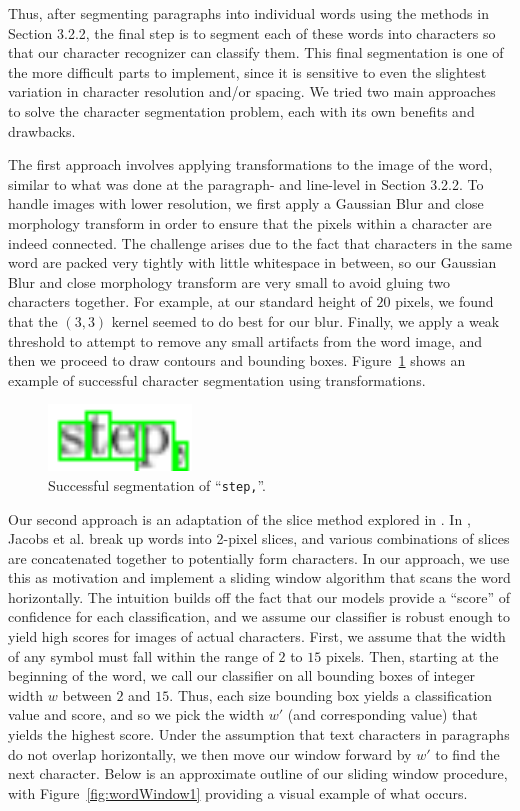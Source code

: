 \documentclass[12pt]{IEEEtran}
\begin{document}
Thus, after segmenting paragraphs into individual words using the methods in Section 3.2.2, the final step is to segment each of these words into characters so that our character recognizer can classify them. This final segmentation is one of the more difficult parts to implement, since it is sensitive to even the slightest variation in character resolution and/or spacing. We tried two main approaches to solve the character segmentation problem, each with its own benefits and drawbacks.

The first approach involves applying transformations to the image of the word, similar to what was done at the paragraph- and line-level in Section 3.2.2. To handle images with lower resolution, we first apply a Gaussian Blur and close morphology transform in order to ensure that the pixels within a character are indeed connected. The challenge arises due to the fact that characters in the same word are packed very tightly with little whitespace in between, so our Gaussian Blur and close morphology transform are very small to avoid gluing two characters together. For example, at our standard height of $20$ pixels, we found that the $(3,3)$ kernel seemed to do best for our blur. Finally, we apply a weak threshold to attempt to remove any small artifacts from the word image, and then we proceed to draw contours and bounding boxes. Figure~\ref{fig:wordBounds1} shows an example of successful character segmentation using transformations.

\begin{figure}[h]
  \centering
    \includegraphics[width=1.5in]{word3-bounds.png}
  \caption{Successful segmentation of ``\texttt{step,}''.}
  \label{fig:wordBounds1}
\end{figure}

Our second approach is an adaptation of the slice method explored in \cite{1}. In \cite{1}, Jacobs et al. break up words into 2-pixel slices, and various combinations of slices are concatenated together to potentially form characters. In our approach, we use this as motivation and implement a sliding window algorithm that scans the word horizontally. The intuition builds off the fact that our models provide a ``score'' of confidence for each classification, and we assume our classifier is robust enough to yield high scores for images of actual characters. First, we assume that the width of any symbol must fall within the range of $2$ to $15$ pixels. Then, starting at the beginning of the word, we call our classifier on all bounding boxes of integer width $w$ between $2$ and $15$. Thus, each size bounding box yields a classification value and score, and so we pick the width $w'$ (and corresponding value) that yields the highest score. Under the assumption that text characters in paragraphs do not overlap horizontally, we then move our window forward by $w'$ to find the next character. Below is an approximate outline of our sliding window procedure, with Figure~\ref{fig:wordWindow1} providing a visual example of what occurs.
\end{document}
